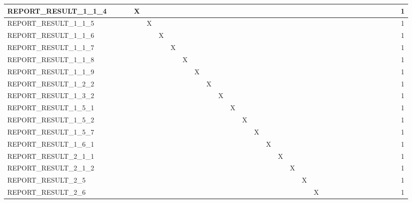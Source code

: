 \documentclass{cslthse-msc}
\begin{document}
\begin{appendices}
\begin{table}[H]
{\begin{tabular}{  l | c | c | c | c | c | c | c | c | c | c | c | c | c | c | c | c | c | c | c | c | c | c | c | c | c | c | c | c | c | c | c  }
	 REPORT\_RESULT\_1\_1\_4 &  &  &  & X &  &  &  &  &  &  &  &  &  &  &  &  &  &  &  &  &  &  &  &  &  &  &  &  &  &  & 1 \\ \hline
	 REPORT\_RESULT\_1\_1\_5 &  &  &  &  & X &  &  &  &  &  &  &  &  &  &  &  &  &  &  &  &  &  &  &  &  &  &  &  &  &  & 1 \\ \hline
	 REPORT\_RESULT\_1\_1\_6 &  &  &  &  &  & X &  &  &  &  &  &  &  &  &  &  &  &  &  &  &  &  &  &  &  &  &  &  &  &  & 1 \\ \hline
	 REPORT\_RESULT\_1\_1\_7 &  &  &  &  &  &  & X &  &  &  &  &  &  &  &  &  &  &  &  &  &  &  &  &  &  &  &  &  &  &  & 1 \\ \hline
	 REPORT\_RESULT\_1\_1\_8 &  &  &  &  &  &  &  & X &  &  &  &  &  &  &  &  &  &  &  &  &  &  &  &  &  &  &  &  &  &  & 1 \\ \hline
	 REPORT\_RESULT\_1\_1\_9 &  &  &  &  &  &  &  &  & X &  &  &  &  &  &  &  &  &  &  &  &  &  &  &  &  &  &  &  &  &  & 1 \\ \hline
	 REPORT\_RESULT\_1\_2\_2 &  &  &  &  &  &  &  &  &  & X &  &  &  &  &  &  &  &  &  &  &  &  &  &  &  &  &  &  &  &  & 1 \\ \hline
	 REPORT\_RESULT\_1\_3\_2 &  &  &  &  &  &  &  &  &  &  & X &  &  &  &  &  &  &  &  &  &  &  &  &  &  &  &  &  &  &  & 1 \\ \hline
	 REPORT\_RESULT\_1\_5\_1 &  &  &  &  &  &  &  &  &  &  &  & X &  &  &  &  &  &  &  &  &  &  &  &  &  &  &  &  &  &  & 1 \\ \hline
	 REPORT\_RESULT\_1\_5\_2 &  &  &  &  &  &  &  &  &  &  &  &  & X &  &  &  &  &  &  &  &  &  &  &  &  &  &  &  &  &  & 1 \\ \hline
	 REPORT\_RESULT\_1\_5\_7 &  &  &  &  &  &  &  &  &  &  &  &  &  & X &  &  &  &  &  &  &  &  &  &  &  &  &  &  &  &  & 1 \\ \hline
	 REPORT\_RESULT\_1\_6\_1 &  &  &  &  &  &  &  &  &  &  &  &  &  &  & X &  &  &  &  &  &  &  &  &  &  &  &  &  &  &  & 1 \\ \hline
	 REPORT\_RESULT\_2\_1\_1 &  &  &  &  &  &  &  &  &  &  &  &  &  &  &  & X &  &  &  &  &  &  &  &  &  &  &  &  &  &  & 1 \\ \hline
	 REPORT\_RESULT\_2\_1\_2 &  &  &  &  &  &  &  &  &  &  &  &  &  &  &  &  & X &  &  &  &  &  &  &  &  &  &  &  &  &  & 1 \\ \hline
	 REPORT\_RESULT\_2\_5 &  &  &  &  &  &  &  &  &  &  &  &  &  &  &  &  &  & X &  &  &  &  &  &  &  &  &  &  &  &  & 1 \\ \hline
	 REPORT\_RESULT\_2\_6 &  &  &  &  &  &  &  &  &  &  &  &  &  &  &  &  &  &  & X &  &  &  &  &  &  &  &  &  &  &  & 1 \\ \hline

\end{tabular}}
\end{table}
\end{appendices}
\end{document}
